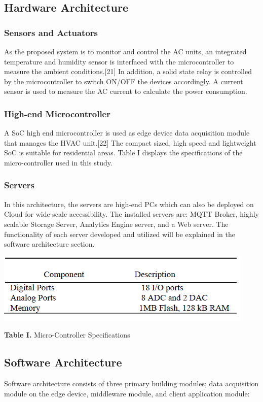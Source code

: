 \documentclass[a4paper,12pt,oneside]{article}
\let\counterwithin\relax
\begin{document}
\subsection{Hardware Architecture}
\subsubsection{Sensors and Actuators}
As the proposed system is to monitor and control the AC
units, an integrated temperature and humidity sensor is
interfaced with the microcontroller to measure the ambient
conditions.[21] In addition, a solid state relay is controlled by the microcontroller
to switch ON/OFF the devices accordingly. A
current sensor is used to measure the AC current to calculate
the power consumption.
\subsubsection{High-end Microcontroller}
A SoC high end microcontroller is used as edge device data
acquisition module that manages the HVAC unit.[22] The
compact sized, high speed and lightweight SoC is suitable for
residential areas. Table I displays the specifications of the
micro-controller used in this study.
\subsubsection{Servers}
In this architecture, the servers are high-end PCs
which can also be deployed on Cloud for wide-scale
accessibility. The installed servers are: MQTT Broker, highly
scalable Storage Server, Analytics Engine server, and a Web
server. The functionality of each server developed and utilized
will be explained in the software architecture section.

\begin{table}[H]
\includegraphics{Table1.png}
\centering
\caption[Micro-Controller Specifications]{\textbf{Table I.} Micro-Controller Specifications}
\end{table}

\subsection{Software Architecture}
Software architecture consists of three primary building
modules; data acquisition module on the edge device,
middleware module, and client application module:
\end{document}
